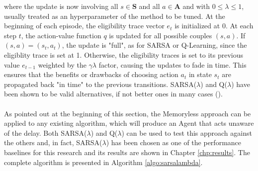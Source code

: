                 where the update is now involving all $s \in \mathbf{S}$ and all $a \in \mathbf{A}$ and with $ 0 \leq \lambda \leq 1$, usually treated as an hyperparameter of the method to be tuned. At the beginning of each episode, the eligibility trace vector $e_t$ is initialized at 0. At each step $t$, the action-value function $q$ is updated for all possible couples $(s, a)$. If $(s, a) = (s_t, a_t)$, the update is "full", as for SARSA or Q-Learning, since the eligiblity trace is set at 1. Otherwise, the eligibility traces is set to its previous value $e_{t-1}$ weighted by the $\gamma \lambda$ factor, causing the updates to fade in time. This ensures that the benefits or drawbacks of choosing action $a_t$ in state $s_t$ are propagated back "in time" to the previous transitions. SARSA($\lambda$) and Q($\lambda$) have been shown to be valid alternatives, if not better ones in many cases ().
                \\\\
                As pointed out at the beginning of this section, the Memoryless approach can be applied to any existing algorithm, which will produce an Agent that acts unaware of the delay. Both SARSA($\lambda$) and Q($\lambda$) can be used to test this approach against the others and, in fact, SARSA($\lambda$) has been chosen as one of the performance baselines for this research and its results are shown in Chapter \ref{chp:results}. The complete algorithm is presented in Algorithm \ref{algo:sarsalambda}.
                
